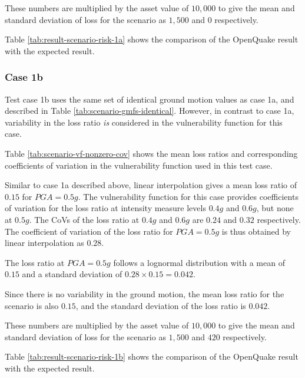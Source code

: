 These numbers are multiplied by the asset value of $10,000$ to give the mean and standard deviation of loss for the scenario as $1,500$ and $0$ respectively.



Table \ref{tab:result-scenario-risk-1a} shows the comparison of the OpenQuake result with the expected result.

\subsubsection{Case 1b}
Test case 1b uses the same set of identical ground motion values as case 1a, and described in Table \ref{tab:scenario-gmfs-identical}. However, in contrast to case 1a, variability in the loss ratio \emph{is} considered in the vulnerability function for this case.



Table \ref{tab:scenario-vf-nonzero-cov} shows the mean loss ratios and corresponding coefficients of variation in the vulnerability function used in this test case.

Similar to case 1a described above, linear interpolation gives a mean loss ratio of $0.15$ for $PGA = 0.5 g$. The vulnerability function for this case provides coefficients of variation for the loss ratio at intensity measure levels $0.4 g$ and $0.6 g$, but none at $0.5 g$. The CoVs of the loss ratio at $0.4 g$ and $0.6 g$ are $0.24$ and $0.32$ respectively. The coefficient of variation of the loss ratio for $PGA = 0.5 g$ is thus obtained by linear interpolation as $0.28$.

The loss ratio at $PGA = 0.5 g$ follows a lognormal distribution with a mean of $0.15$ and a standard deviation of $0.28 \times 0.15 = 0.042$.

Since there is no variability in the ground motion, the mean loss ratio for the scenario is also $0.15$, and the standard deviation of the loss ratio is $0.042$.

These numbers are multiplied by the asset value of $10,000$ to give the mean and standard deviation of loss for the scenario as $1,500$ and $420$ respectively.



Table \ref{tab:result-scenario-risk-1b} shows the comparison of the OpenQuake result with the expected result.

